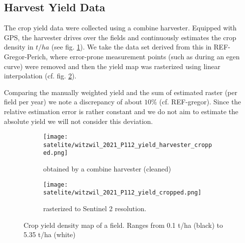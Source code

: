 	\subsection{Harvest Yield Data}{
		\label{sec:yieldmapping_data}
		The crop yield data were collected using a combine harvester. Equipped with GPS, the harvester drives over the fields and continuously estimates the crop density in $t/ha$ (see fig. \ref{fig:satelite/witzwil_2021_P112_yield_harvester_cropped}). 
		We take the data set derived from this in REF-Gregor-Perich, where error-prone measurement points (such as during an egen curve) were removed and then the yield map was rasterized using linear interpolation (cf. fig. \ref{fig:satelite/witzwil_2021_P112_yield_cropped.png}).    

		
		Comparing the manually weighted yield and the sum of estimated raster (per field per year) we note a discrepancy of about $10\%$ (cf. REF-gregor). Since the relative estimation error is rather constant and we do not aim to estimate the absolute yield we will not consider this deviation.
		\begin{figure}
			\centering
			\begin{subfigure}{.5\textwidth}
			  \centering
			  \texttt{[image: satelite/witzwil\_2021\_P112\_yield\_harvester\_cropped.png]}
			  \caption{obtained by a combine harvester (cleaned)}
			  \label{fig:satelite/witzwil_2021_P112_yield_harvester_cropped}
			\end{subfigure}%
			\begin{subfigure}{.5\textwidth}
				\centering
				\texttt{[image: satelite/witzwil\_2021\_P112\_yield\_cropped.png]}
			  \caption{rasterized to Sentinel 2 resolution.}
			  \label{fig:satelite/witzwil_2021_P112_yield_cropped.png}
			\end{subfigure}
			\caption{Crop yield density map of a field. Ranges from 0.1 t/ha (black) to 5.35 t/ha (white) }
			\label{fig:satelite_witzwil_yield}
		\end{figure}
	}


